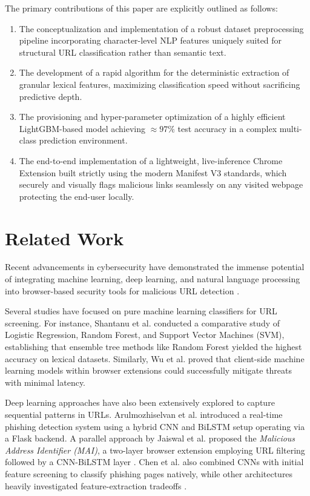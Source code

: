 \documentclass[conference]{IEEEtran}
\begin{document}
The primary contributions of this paper are explicitly outlined as follows:
\begin{enumerate}
    \item The conceptualization and implementation of a robust dataset preprocessing pipeline incorporating character-level NLP features uniquely suited for structural URL classification rather than semantic text.
    \item The development of a rapid algorithm for the deterministic extraction of granular lexical features, maximizing classification speed without sacrificing predictive depth.
    \item The provisioning and hyper-parameter optimization of a highly efficient LightGBM-based model achieving $\approx 97\%$ test accuracy in a complex multi-class prediction environment.
    \item The end-to-end implementation of a lightweight, live-inference Chrome Extension built strictly using the modern Manifest V3 standards, which securely and visually flags malicious links seamlessly on any visited webpage protecting the end-user locally.
\end{enumerate}

\section{Related Work}
Recent advancements in cybersecurity have demonstrated the immense potential of integrating machine learning, deep learning, and natural language processing into browser-based security tools for malicious URL detection \cite{marchal2016know, desai2017malicious, jain2018towards}. 

Several studies have focused on pure machine learning classifiers for URL screening. For instance, Shantanu et al. \cite{shantanu2021malicious} conducted a comparative study of Logistic Regression, Random Forest, and Support Vector Machines (SVM), establishing that ensemble tree methods like Random Forest yielded the highest accuracy on lexical datasets. Similarly, Wu et al. \cite{wu2023phishing} proved that client-side machine learning models within browser extensions could successfully mitigate threats with minimal latency. 

Deep learning approaches have also been extensively explored to capture sequential patterns in URLs. Arulmozhiselvan et al. \cite{arulmozhiselvan2025real} introduced a real-time phishing detection system using a hybrid CNN and BiLSTM setup operating via a Flask backend. A parallel approach by Jaiswal et al. \cite{jaiswal2023malicious} proposed the \textit{Malicious Address Identifier (MAI)}, a two-layer browser extension employing URL filtering followed by a CNN-BiLSTM layer \cite{das2020deep}. Chen et al. \cite{chen2020malicious} also combined CNNs with initial feature screening to classify phishing pages natively, while other architectures heavily investigated feature-extraction tradeoffs \cite{chen2020intelligent, kumar2017malicious}. 
\end{document}
